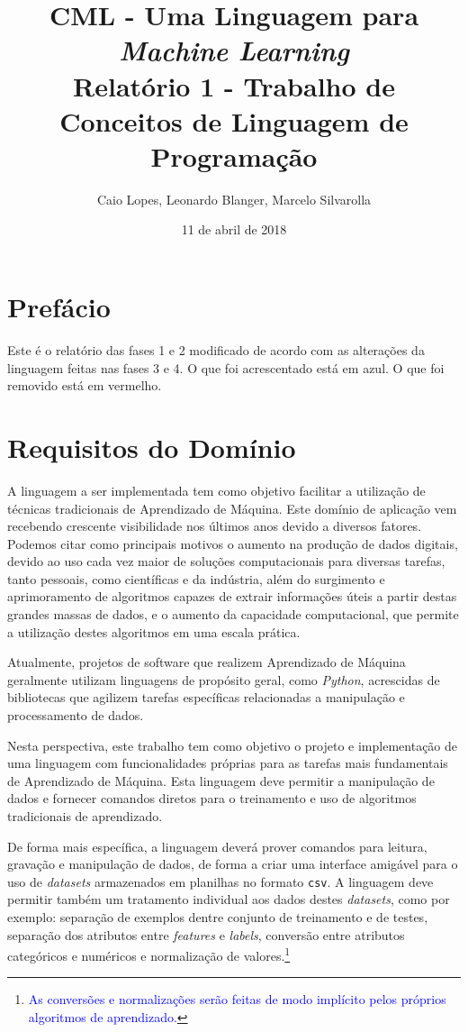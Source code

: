 \documentclass[12pt]{article}
\title{CML - Uma Linguagem para {\it Machine Learning} \\ \Large Relatório 1 \blu{versão 2} - Trabalho de Conceitos de Linguagem de Programação}
\author{Caio Lopes, Leonardo Blanger, Marcelo Silvarolla}
\date{11 de abril de 2018}
\newcommand{\blu}{\textcolor{blue}}
\begin{document}
\maketitle
\section{Prefácio}
Este é o relatório das fases 1 e 2 modificado de acordo com as alterações da linguagem feitas nas fases 3 e 4. O que foi acrescentado está em azul. O que foi removido está em vermelho.

\section{Requisitos do Domínio}

A linguagem a ser implementada tem como objetivo facilitar a utilização de técnicas tradicionais de Aprendizado de Máquina. Este domínio de aplicação vem recebendo crescente visibilidade nos últimos anos devido a diversos fatores. Podemos citar como principais motivos o aumento na produção de dados digitais, devido ao uso cada vez maior de soluções computacionais para diversas tarefas, tanto pessoais, como científicas e da indústria, além do surgimento e aprimoramento de algoritmos capazes de extrair informações úteis a partir destas grandes massas de dados, e o aumento da capacidade computacional, que permite a utilização destes algoritmos em uma escala prática.

Atualmente, projetos de software que realizem Aprendizado de Máquina geralmente utilizam linguagens de propósito geral, como {\it Python}, acrescidas de bibliotecas que agilizem tarefas específicas relacionadas a manipulação e processamento de dados.

Nesta perspectiva, este trabalho tem como objetivo o projeto e implementação de uma linguagem com funcionalidades próprias para as tarefas mais fundamentais de Aprendizado de Máquina. Esta linguagem deve permitir a manipulação de dados e fornecer comandos diretos para o treinamento e uso de algoritmos tradicionais de aprendizado.

De forma mais específica, a linguagem deverá prover comandos para leitura, gravação e manipulação de dados, de forma a criar uma interface amigável para o uso de {\it datasets} armazenados em planilhas no formato {\tt csv}. A linguagem deve permitir também um tratamento individual aos dados destes {\it datasets}, como por exemplo: separação de exemplos dentre conjunto de treinamento e de testes, separação dos atributos entre {\it features} e {\it labels}, conversão entre atributos categóricos e numéricos e normalização de valores.\footnote{\blu{As conversões e normalizações serão feitas de modo implícito pelos próprios algoritmos de aprendizado.}}
\end{document}
